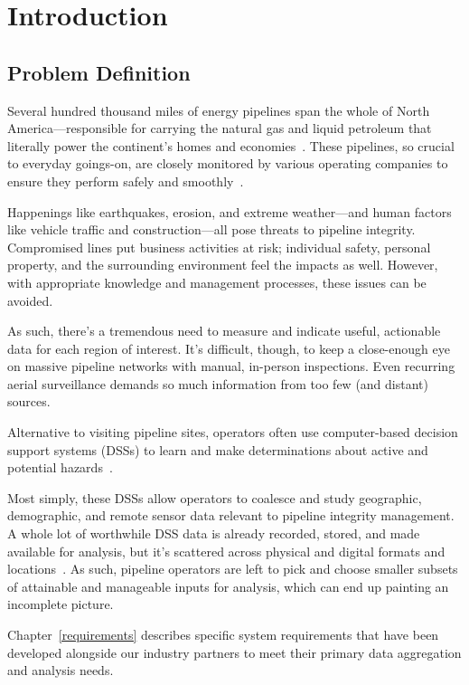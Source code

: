 \chapter{Introduction}
\label{intro}

\section{Problem Definition}
\label{Problem}
Several hundred thousand miles of energy pipelines span the whole of North America---responsible for carrying the natural gas and liquid petroleum that literally power the continent's homes and economies~\cite{PHMSA}. These pipelines, so crucial to everyday goings-on, are closely monitored by various operating companies to ensure they perform safely and smoothly~\cite{PHMSA2013}.

Happenings like earthquakes, erosion, and extreme weather---and human factors like vehicle traffic and construction---all pose threats to pipeline integrity. Compromised lines put business activities at risk; individual safety, personal property, and the surrounding environment feel the impacts as well. However, with appropriate knowledge and management processes, these issues can be avoided.

As such, there's a tremendous need to measure and indicate useful, actionable data for each region of interest. It's difficult, though, to keep a close-enough eye on massive pipeline networks with manual, in-person inspections. Even recurring aerial surveillance demands so much information from too few (and distant) sources.

Alternative to visiting pipeline sites, operators often use computer-based decision support systems (DSSs) to learn and make determinations about active and potential hazards~\cite{PHMSA2013,Dunning2013}. 

Most simply, these DSSs allow operators to coalesce and study geographic, demographic, and remote sensor data relevant to pipeline integrity management. A whole lot of worthwhile DSS data is already recorded, stored, and made available for analysis, but it's scattered across physical and digital formats and locations~\cite{Dunning2013}. As such, pipeline operators are left to pick and choose smaller subsets of attainable and manageable inputs for analysis, which can end up painting an incomplete picture.

Chapter~\ref{requirements} describes specific system requirements that have been developed alongside our industry partners to meet their primary data aggregation and analysis needs.

